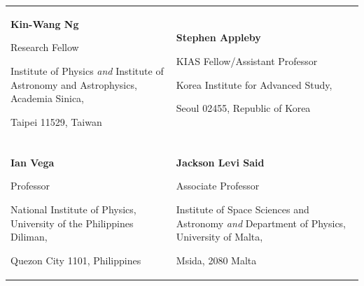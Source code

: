 

\begin{tabularx}{\textwidth}{@{}X X@{}}
\\
\textbf{Kin-Wang Ng}\par
Research Fellow\par
Institute of Physics \textit{and} Institute of Astronomy and Astrophysics, Academia Sinica,\par 
Taipei 11529, Taiwan\par 
\makefield{\faEnvelope[regular]}{\url{nkw@phys.sinica.edu.tw}}
& 
\textbf{Stephen Appleby}\par
KIAS Fellow/Assistant Professor\par
Korea Institute for Advanced Study,\par
Seoul 02455, Republic of Korea\par 
\makefield{\faEnvelope[regular]}{\url{stephen@kias.re.kr}}
\\ \\
\textbf{Ian Vega}\par
Professor\par
National Institute of Physics, University of the Philippines Diliman,\par 
Quezon City 1101, Philippines\par 
\makefield{\faEnvelope[regular]}{\url{ivega@nip.upd.edu.ph}}
&
\textbf{Jackson Levi Said}\par
Associate Professor\par
Institute of Space Sciences and Astronomy \textit{and} Department of Physics, University of Malta,\par 
Msida, 2080 Malta\par 
\makefield{\faEnvelope[regular]}{\url{jackson.said@um.edu.mt}}
\end{tabularx}
